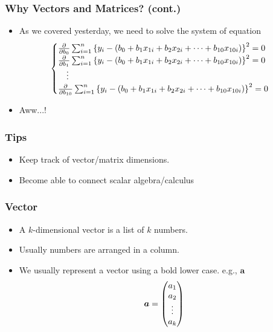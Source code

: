 \documentclass[pdflatex, 12pt]{beamer}
\begin{document}
\begin{frame}
\frametitle{Why Vectors and Matrices? (cont.)}
\begin{itemize}
\item As we covered yesterday, we need to solve the system of equation
 \begin{eqnarray}
 \begin{cases}
 \frac{\partial}{\partial b_{0}} \sum_{i = 1}^n \left\{y_i - (b_0 + b_1 x_{1i} + b_2 x_{2i} + \cdots + b_{10} x_{10i})\right\}^2 = 0 \\
 \frac{\partial}{\partial b_{1}} \sum_{i = 1}^n \left\{y_i - (b_0 + b_1 x_{1i} + b_2 x_{2i} + \cdots + b_{10} x_{10i})\right\}^2 = 0 \\
 \ \ \ \vdots \\
 \frac{\partial}{\partial b_{10}} \sum_{i = 1}^n \left\{y_i - (b_0 + b_1 x_{1i} + b_2 x_{2i} + \cdots + b_{10} x_{10i})\right\}^2 = 0 \notag
 \end{cases}
 \end{eqnarray}
\vspace{0.2cm}
\item Aww...!
\end{itemize}
\end{frame}

\begin{frame}
\frametitle{Tips}
\begin{itemize}
\item Keep track of vector/matrix dimensions.
\vspace{0.4cm}
\item Become able to connect scalar algebra/calculus
\end{itemize}
\end{frame}

\begin{frame}
\frametitle{Vector}
\begin{itemize}
\item A $k$-dimensional vector is a list of $k$ numbers.
\vspace{0.4cm}
\item Usually numbers are arranged in a column.
\vspace{0.4cm}
\item We usually represent a vector using a bold lower case. e.g., $\bm{a}$ 
 \begin{equation}
 \bm{a} = \begin{pmatrix}
 a_1 \\
 a_2 \\
 \vdots \\
 a_k
 \end{pmatrix} \notag
 \end{equation}
\end{itemize}
\end{frame}
\end{document}
